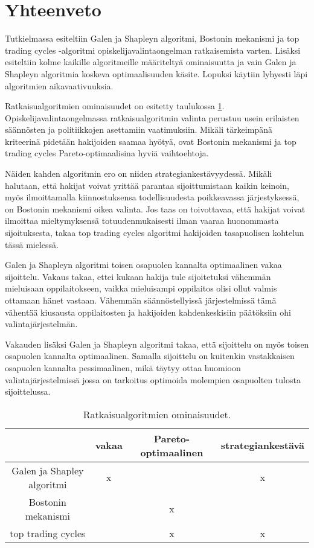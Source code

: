 \documentclass[twoside]{tktltiki}
\begin{document}
\section{Yhteenveto}

Tutkielmassa esiteltiin Galen ja Shapleyn algoritmi, Bostonin
mekanismi ja top trading cycles -algoritmi opiskelijavalintaongelman
ratkaisemista varten. Lisäksi esiteltiin kolme kaikille algoritmeille
määriteltyä ominaisuutta ja vain Galen ja Shapleyn algoritmia koskeva
optimaalisuuden käsite. Lopuksi käytiin lyhyesti läpi algoritmien
aikavaativuuksia.

Ratkaisualgoritmien ominaisuudet on esitetty taulukossa
\ref{algoritmi_ominaisuudet}. Opiskelijavalintaongelmassa
ratkaisualgoritmin valinta perustuu usein erilaisten säännösten ja
politiikkojen asettamiin vaatimuksiin. Mikäli tärkeimpänä kriteerinä
pidetään hakijoiden saamaa hyötyä, ovat Bostonin mekanismi ja top
trading cycles Pareto-optimaalisina hyviä vaihtoehtoja.

Näiden kahden algoritmin ero on niiden strategiankestävyydessä. Mikäli
halutaan, että hakijat voivat yrittää parantaa sijoittumistaan kaikin
keinoin, myös ilmoittamalla kiinnostuksensa todellisuudesta
poikkeavassa järjestyksessä, on Bostonin mekanismi oikea valinta. Jos
taas on toivottavaa, että hakijat voivat ilmoittaa mieltymyksensä
totuudenmukaisesti ilman vaaraa huonommasta sijoituksesta, takaa top
trading cycles algoritmi hakijoiden tasapuolisen kohtelun tässä
mielessä.

Galen ja Shapleyn algoritmi toisen osapuolen kannalta optimaalinen
vakaa sijoittelu. Vakaus takaa, ettei kukaan hakija tule sijoitetuksi
vähemmän mieluisaan oppilaitokseen, vaikka mieluisampi oppilaitos
olisi ollut valmis ottamaan hänet vastaan. Vähemmän säännöstellyissä
järjestelmissä tämä vähentää kiusausta oppilaitosten ja hakijoiden
kahdenkeskisiin päätöksiin ohi valintajärjestelmän.

Vakauden lisäksi Galen ja Shapleyn algoritmi takaa, että sijoittelu on
myös toisen osapuolen kannalta optimaalinen. Samalla sijoittelu on
kuitenkin vastakkaisen osapuolen kannalta pessimaalinen, mikä täytyy
ottaa huomioon valintajärjestelmissä jossa on tarkoitus optimoida
molempien osapuolten tulosta sijoittelussa.

\begin{table}[]
  \begin{center}
    \begin{tabular}{ c | c c c }
      & vakaa & Pareto-optimaalinen & strategiankestävä \\
      \hline
      Galen ja Shapley algoritmi & x & & x \\
      Bostonin mekanismi & & x & \\
      top trading cycles & & x & x \\
    \end{tabular}
    \caption{Ratkaisualgoritmien ominaisuudet.}
    \label{algoritmi_ominaisuudet}
  \end{center}
\end{table}
\end{document}
